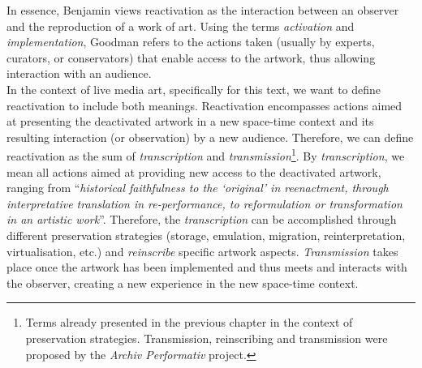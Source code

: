 In essence, Benjamin views reactivation as the interaction between an observer and the reproduction of a work of art. Using the terms \textit{activation} and \textit{implementation}, Goodman refers to the actions taken (usually by experts, curators, or conservators) that enable access to the artwork, thus allowing interaction with an audience.\\
In the context of live media art, specifically for this text, we want to define reactivation to include both meanings. Reactivation encompasses actions aimed at presenting the deactivated artwork in a new space-time context and its resulting interaction (or observation) by a new audience. Therefore, we can define reactivation as the sum of \textit{transcription} and \textit{transmission}\footnote{Terms already presented in the previous chapter in the context of preservation strategies. Transmission, reinscribing and transmission were proposed by the \textit{Archiv Performativ} project.}. By \textit{transcription}, we mean all actions aimed at providing new access to the deactivated artwork, ranging from ``\textit{historical faithfulness to the ‘original’ in reenactment, through interpretative translation in re-performance, to reformulation or transformation in an artistic work}''. Therefore, the \textit{transcription} can be accomplished through different preservation strategies (storage, emulation, migration, reinterpretation, virtualisation, etc.) and \textit{reinscribe} specific artwork aspects. \textit{Transmission} takes place once the artwork has been implemented and thus meets and interacts with the observer, creating a new experience in the new space-time context.

